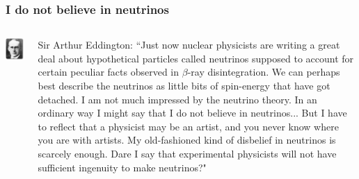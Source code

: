 \begin{frame}
\frametitle{I do not believe in neutrinos}
\begin{columns}
\includegraphics[scale=0.3]{img/eddington.png}
 
Sir Arthur Eddington: ``Just now nuclear physicists are writing a great deal about hypothetical particles called neutrinos supposed to account for certain peculiar facts observed in $\beta$-ray disintegration. We can perhaps best describe the neutrinos as little bits of spin-energy that have got detached. I am not much impressed by the neutrino theory. In an ordinary way I might say that I do not believe in neutrinos... But I have to reflect that a physicist may be an artist, and you never know where you are with artists. My old-fashioned kind of disbelief in neutrinos is scarcely enough. Dare I say that experimental physicists will not have sufficient ingenuity to make neutrinos?"

\end{columns}
\end{frame}

